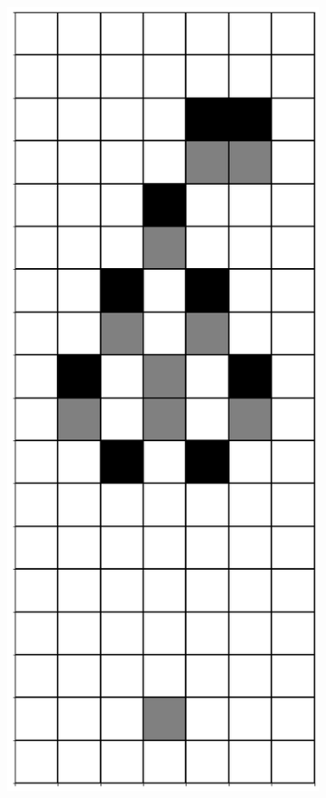 \documentclass[12pt]{article}
\numberwithin{figure}{section} %
\begin{document}
\begin{figure}[H]
\begin{subfigure}{0.18\textwidth}
     		\subcaption{}
   	\end{subfigure}
        	\begin{subfigure}{0.18\textwidth}
     		\centering
     		\includegraphics[width=\linewidth]{Section4/18.3}

\end{subfigure}
\end{figure}
\end{document}
